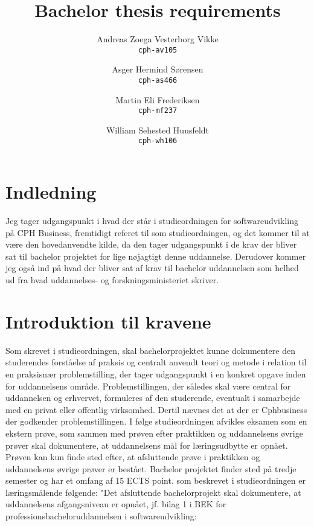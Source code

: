 \documentclass{report}
\title{Bachelor thesis requirements}
\author{
    Andreas Zoega Vesterborg Vikke\\
    \texttt{cph-av105}
    \and
    Asger Hermind Sørensen\\
    \texttt{cph-as466}
    \and
    Martin Eli Frederiksen\\
    \texttt{cph-mf237}
    \and
    William Sehested Huusfeldt\\
    \texttt{cph-wh106}
}
\date{}
\begin{document}
\maketitle
\newpage


\tableofcontents
\newpage
\section{Indledning}
Jeg tager udgangspunkt i hvad der står i studieordningen for softwareudvikling på CPH Business,
fremtidigt referet til som studieordningen, og det kommer til at være den hovedanvendte kilde,
da den tager udgangspunkt i de krav der bliver sat til bachelor projektet for lige nøjagtigt 
denne uddannelse. Derudover kommer jeg også ind på hvad der bliver sat af krav til bachelor uddannelsen
som helhed ud fra hvad uddannelses- og forskningsministeriet skriver. 

\section{Introduktion til kravene}
Som skrevet i studieordningen\cite{studieordning}, 
skal bachelorprojektet kunne dokumentere den studerendes forståelse af praksis og centralt
anvendt teori og metode i relation til en praksisnær problemstilling, der tager udgangspunkt i en konkret 
opgave inden for uddannelsens område. Problemstillingen, der således skal være central for 
uddannelsen og erhvervet, formuleres af den studerende, eventualt i samarbejde med en privat eller offentlig virksomhed.
Dertil nævnes det at der er Cphbusiness der godkender problemstillingen. I følge studieordningen afvikles 
eksamen som en ekstern prøve, som sammen med prøven efter praktikken og uddannelsens øvrige prøver skal dokumentere, 
at uddannelsens mål for læringsudbytte er opnået. Prøven kan kun finde sted efter, at afsluttende prøve i 
praktikken og uddannelsens øvrige prøver er bestået.
Bachelor projektet finder sted på tredje semester og har et omfang af 15 ECTS point.
som beskrevet i studieordningen er læringsmålende følgende:
"Det afsluttende bachelorprojekt skal dokumentere, at uddannelsens
afgangsniveau er opnået, jf. bilag 1 i BEK for professionsbacheloruddannelsen i
softwareudvikling:\\
\end{document}
